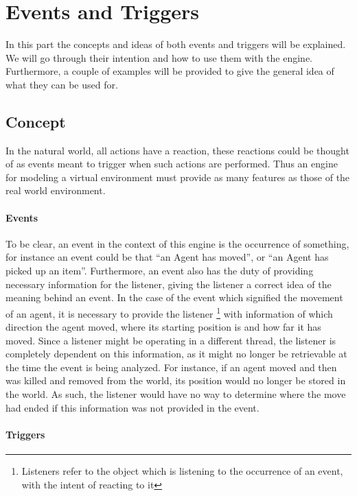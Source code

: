
\section{Events and Triggers\label{sec:SystenFeaturesEventAndTriggers}}

In this part the concepts and ideas of both events and triggers will
be explained. We will go through their intention and how to use them
with the engine. Furthermore, a couple of examples will be provided
to give the general idea of what they can be used for. 


\subsection{Concept}

In the natural world, all actions have a reaction, these reactions
could be thought of as events meant to trigger when such actions are
performed. Thus an engine for modeling a virtual environment must
provide as many features as those of the real world environment.


\paragraph*{Events}

To be clear, an event in the context of this engine is the occurrence
of something, for instance an event could be that \textquotedblleft{}an
Agent has moved\textquotedblright{}, or \textquotedblleft{}an Agent
has picked up an item\textquotedblright{}. Furthermore, an event also
has the duty of providing necessary information for the listener,
giving the listener a correct idea of the meaning behind an event.
In the case of the event which signified the movement of an agent,
it is necessary to provide the listener %
\footnote{Listeners refer to the object which is listening to the occurrence
of an event, with the intent of reacting to it%
} with information of which direction the agent moved, where its starting
position is and how far it has moved. Since a listener might be operating
in a different thread, the listener is completely dependent on this
information, as it might no longer be retrievable at the time the
event is being analyzed. For instance, if an agent moved and then
was killed and removed from the world, its position would no longer
be stored in the world. As such, the listener would have no way to
determine where the move had ended if this information was not provided
in the event.


\paragraph*{Triggers}

